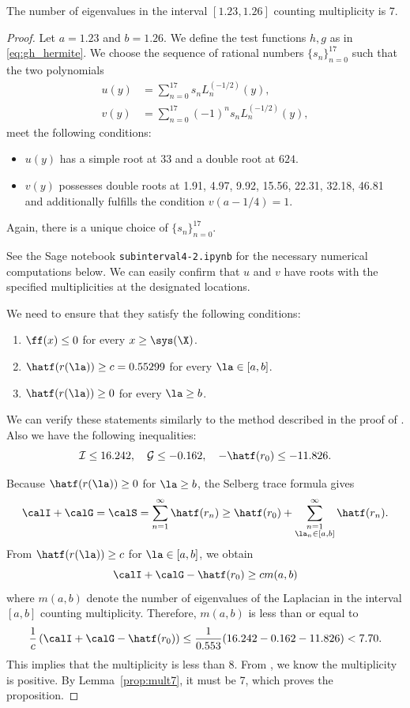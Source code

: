 \begin{prop}\label{prop:subinterval4-2}
The number of eigenvalues in the interval $[1.23,1.26]$ counting multiplicity is 7.
\end{prop}
\begin{proof}
Let $a = 1.23$ and $b=1.26$. 
We define the test functions $h,g$ as in \eqref{eq:gh_hermite}.
We choose the sequence of rational numbers \(\{s_n\}_{n=0}^{17}\) such that the two polynomials
\begin{align*}
u(y) &= \sum_{n=0}^{17} s_n L_n^{(-1/2)}(y),\\
v(y) &= \sum_{n=0}^{17} (-1)^n s_n L_n^{(-1/2)}(y),
\end{align*}
meet the following conditions:
\begin{itemize}
    \item \(u(y)\) has a simple root at \(33\) and a double root at \(624\).
    \item \(v(y)\) possesses double roots at 1.91, 4.97, 9.92, 15.56, 22.31, 32.18, 46.81 and additionally fulfills the condition \(v(a-1/4) = 1\).
\end{itemize}
Again, there is a unique choice of \(\{s_n\}_{n=0}^{17}\).

See the Sage notebook \texttt{subinterval4-2.ipynb} for the necessary numerical computations below.
We can easily confirm that $u$ and $v$ have roots with the specified multiplicities at the designated locations.

We need to ensure that they satisfy the following conditions:
\begin{enumerate}
    \item $\ff(x)\leq 0$ for every $x \geq \sys(\X)$.
    \item $\hatf(r(\la))\geq c=0.55299$ for every $\la \in [a, b]$.
    \item $\hatf(r(\la))\geq 0$ for every $\la \geq b$.
\end{enumerate}
We can verify these statements similarly to the method described in the proof of .
Also we have the following inequalities:
\[
\mathcal{I} \leq 16.242, \quad \mathcal{G} \leq -0.162, \quad -\hatf(r_0) \leq -11.826.
\]

Because $\hatf(r(\la))\geq 0$ for $\la \geq b$, the Selberg trace formula gives
\[
\calI+\calG = \calS  =  \sum_{n=1}^{\infty}\hatf(r_n) \geq
\hatf(r_0) + \sum_{\substack{n=1 \\ \la_n\in [a,b]}}^{\infty}\hatf(r_n).
\]
From $\hatf(r(\la))\geq c$ for $\la\in [a,b]$, 
we obtain
\[
\calI+\calG - \hatf(r_0)  \geq  c m(a,b)
\]
where $m(a,b)$ denote the number of eigenvalues of the Laplacian in the interval $[a,b]$ counting multiplicity.
Therefore, $m(a,b)$ is less than or equal to
\begin{equation}
\frac{1}{c}\left(\calI+\calG - \hatf(r_0) \right) \leq \frac{1}{0.553}(16.242 - 0.162 - 11.826)< 7.70.
\end{equation}
This implies that the multiplicity is less than 8.
From , we know the multiplicity is positive.
By Lemma~\ref{prop:mult7}, it must be 7, which proves the proposition.
\end{proof}


